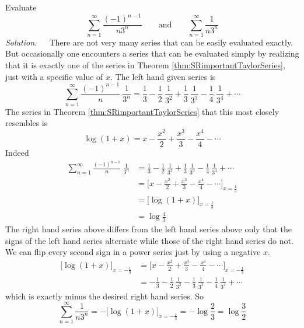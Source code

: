 \begin{eg}\label{eg:lntwo}
Evaluate
\begin{equation*}
\sum_{n=1}^\infty \frac{(-1)^{n-1}}{n3^n}\qquad\text{and}\qquad
\sum_{n=1}^\infty \frac{1}{n3^n}
\end{equation*}
\noindent\emph{Solution.}\ \ \
There are not very many series that can be easily evaluated exactly.
But occasionally one encounters a series that can be evaluated simply
by realizing that it is exactly one of the series in
Theorem \ref{thm:SRimportantTaylorSeries}, just with a specific value
of $x$. The left hand given series is
\begin{equation*}
\sum_{n=1}^\infty \frac{(-1)^{n-1}}{n}\ \frac{1}{3^n}
= \frac{1}{3}-\frac{1}{2}\ \frac{1}{3^2}+\frac{1}{3}\ \frac{1}{3^3}
  -\frac{1}{4}\ \frac{1}{3^4}+\cdots
\end{equation*}
The series in Theorem \ref{thm:SRimportantTaylorSeries} that this
most closely resembles is
\begin{equation*}
\log(1+x) = x-\frac{x^2}{2}+\frac{x^3}{3}-\frac{x^4}{4}-\cdots
\end{equation*}
Indeed
\begin{align*}
\sum_{n=1}^\infty \frac{(-1)^{n-1}}{n}\ \frac{1}{3^n}
&= \frac{1}{3}-\frac{1}{2}\ \frac{1}{3^2}+\frac{1}{3}\ \frac{1}{3^3}
  -\frac{1}{4}\ \frac{1}{3^4}+\cdots \\
& = \bigg[x-\frac{x^2}{2}+\frac{x^3}{3}-\frac{x^4}{4}-\cdots\bigg]_{x=\frac{1}{3}}\\
& = \Big[\log(1+x) \Big]_{x=\frac{1}{3}} \\
& = \log \frac{4}{3}
\end{align*}
The right hand series above differs from the left hand series above
only that the signs of the left hand series alternate while those of the right
hand series do not. We can flip every second sign in a power series
just by using a negative $x$.
\begin{align*}
\Big[\log(1+x) \Big]_{x=-\frac{1}{3}}
&=\bigg[x-\frac{x^2}{2}+\frac{x^3}{3}-\frac{x^4}{4}-\cdots
       \bigg]_{x=-\frac{1}{3}} \\
&= -\frac{1}{3}-\frac{1}{2}\ \frac{1}{3^2}-\frac{1}{3}\ \frac{1}{3^3}
  -\frac{1}{4}\ \frac{1}{3^4}+\cdots
\end{align*}
which is exactly minus the desired right hand series. So
\begin{equation*}
\sum_{n=1}^\infty \frac{1}{n3^n}
=- \Big[\log(1+x) \Big]_{x=-\frac{1}{3}}
=-\log\frac{2}{3}
=\log\frac{3}{2}
\end{equation*}


\end{eg}


